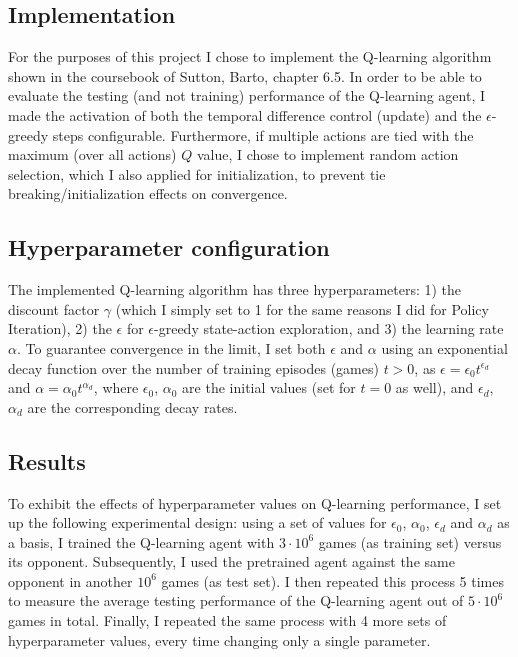 \subsection{Implementation}

For the purposes of this project I chose to implement the Q-learning algorithm shown in the coursebook of Sutton, Barto, chapter 6.5. In order to be able to evaluate the testing (and not training) performance of the Q-learning agent, I made the activation of both the temporal difference control (update) and the $\epsilon$-greedy steps configurable. Furthermore, if multiple actions are tied with the maximum (over all actions) $Q$ value, I chose to implement random action selection, which I also applied for initialization, to prevent tie breaking/initialization effects on convergence.

\subsection{Hyperparameter configuration}

The implemented Q-learning algorithm has three hyperparameters: 1) the discount factor $\gamma$ (which I simply set to 1 for the same reasons I did for Policy Iteration), 2) the $\epsilon$ for $\epsilon$-greedy state-action exploration, and 3) the learning rate $\alpha$. To guarantee convergence in the limit, I set both $\epsilon$ and $\alpha$ using an exponential decay function over the number of training episodes (games) $t>0$, as $\epsilon = \epsilon_0 t^{\epsilon_d}$ and $\alpha = \alpha_0 t^{\alpha_d}$, where $\epsilon_0$, $\alpha_0$ are the initial values (set for $t=0$ as well), and $\epsilon_d$, $\alpha_d$ are the corresponding decay rates. 

\subsection{Results}

To exhibit the effects of hyperparameter values on Q-learning performance, I set up the following experimental design: using a set of values for $\epsilon_0$, $\alpha_0$, $\epsilon_d$ and $\alpha_d$ as a basis, I trained the Q-learning agent with $3\cdot10^6$ games (as training set) versus its opponent. Subsequently, I used the pretrained agent against the same opponent in another $10^6$ games (as test set). I then repeated this process 5 times to measure the average testing performance of the Q-learning agent out of $5\cdot10^6$ games in total. Finally, I repeated the same process with 4 more sets of hyperparameter values, every time changing only a single parameter.

